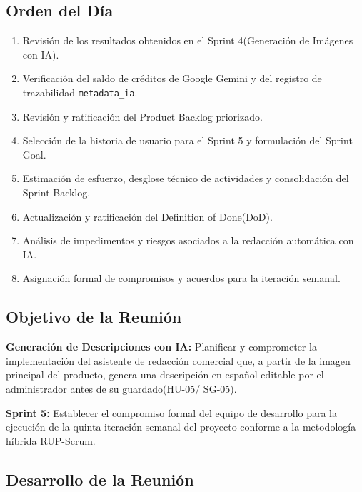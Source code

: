 \documentclass[12pt,a4paper]{article}
\begin{document}
\subsection*{Orden del Día}

\begin{enumerate}
    \item Revisión de los resultados obtenidos en el Sprint 4(Generación de Imágenes con IA).
    \item Verificación del saldo de créditos de Google Gemini y del registro de trazabilidad \texttt{metadata\_ia}.
    \item Revisión y ratificación del Product Backlog priorizado.
    \item Selección de la historia de usuario para el Sprint 5 y formulación del Sprint Goal.
    \item Estimación de esfuerzo, desglose técnico de actividades y consolidación del Sprint Backlog.
    \item Actualización y ratificación del Definition of Done(DoD).
    \item Análisis de impedimentos y riesgos asociados a la redacción automática con IA.
    \item Asignación formal de compromisos y acuerdos para la iteración semanal.
\end{enumerate}

\subsection*{Objetivo de la Reunión}

\textbf{Generación de Descripciones con IA:} Planificar y comprometer la implementación del asistente de redacción comercial que, a partir de la imagen principal del producto, genera una descripción en español editable por el administrador antes de su guardado(HU-05/ SG-05).

\textbf{Sprint 5:} Establecer el compromiso formal del equipo de desarrollo para la ejecución de la quinta iteración semanal del proyecto conforme a la metodología híbrida RUP-Scrum.

\subsection*{Desarrollo de la Reunión}
\end{document}
